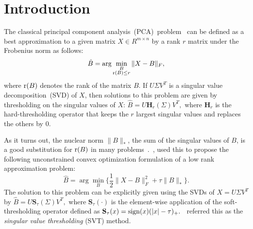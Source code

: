 \documentclass[twoside,11pt]{article}
\begin{document}
\section{Introduction}

The classical principal component analysis~(PCA)~problem~\citep{svd,pca} can be defined as a best approximation to a given matrix $X\in R^{m\times n}$ by a rank $r$ matrix under the Frobenius norm as follows:
\begin{eqnarray}\label{pca}
\hat{B}=\displaystyle{\arg\min_{\substack{B\\{\rm r}(B)\leq r}}\|X-B\|_F},
\end{eqnarray}
\noindent where ${\rm r}(B)$ denotes the rank of the matrix $B$. If $U\Sigma V^T$ is a singular value decomposition~(SVD) of $X$, then solutions to this problem are given by thresholding on the singular values of $X
$: $\hat{B}=U{\mathbf H}_r(\Sigma)V^T,$
where ${\mathbf H}_r$ is the hard-thresholding operator that keeps the $r$ largest singular values and replaces the others by $0$.

As it turns out, the nuclear norm $\|B\|_*$, the sum of the singular values of $B$, is a good substitution for ${\rm r}(B)$ in many problems~\citep{candesplan}.~\citet{caicandesshen}, used this to propose the following unconstrained convex optimization formulation of a low rank approximation problem:
\begin{equation}\label{svt}
\hat{B}=\arg\min_B\{\frac{1}{2}\|X-B\|_F^2+\tau \|B\|_*\}.
\end{equation}
The solution to this problem can be explicitly given using the SVDs of $X=U\Sigma V^T$ by
$
\hat{B}=U{\mathbf S}_{\tau}(\Sigma)V^T,
$
where ${\mathbf S}_{\tau}(\cdot)$ is the element-wise application of the soft-thresholding operator defined as $ {\mathbf S}_{\tau}(x)={\rm sign}(x)(|x|-\tau)_+.$~\citet{caicandesshen} referred this as the {\it singular value thresholding} (SVT) method.
\end{document}

